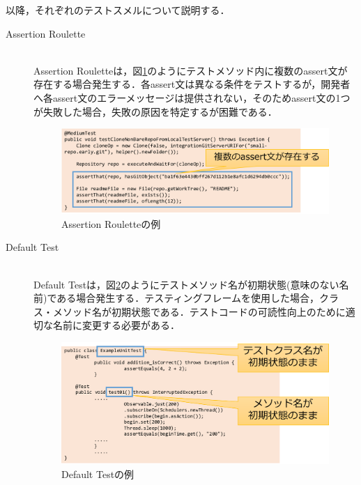 \documentclass[12pt]{jarticle} %
\begin{document}
以降，それぞれのテストスメルについて説明する．

\begin{description}
\item[Assertion Roulette]~\\
Assertion Rouletteは，図\ref{AR}のようにテストメソッド内に複数のassert文が存在する場合発生する．各assert文は異なる条件をテストするが，開発者へ各assert文のエラーメッセージは提供されない，そのためassert文の1つが失敗した場合，失敗の原因を特定するが困難である．

\begin{figure}[htbp]
  \begin{center}
    \includegraphics[clip,width=15cm]{AR.pdf}
    \caption{Assertion Rouletteの例}
    \label{AR}
  \end{center}
\end{figure}

\item[Default Test]~\\
Default Testは，図\ref{DT}のようにテストメソッド名が初期状態(意味のない名前)である場合発生する．テスティングフレームを使用した場合，クラス・メソッド名が初期状態である．テストコードの可読性向上のために適切な名前に変更する必要がある．

\begin{figure}[htbp]
  \begin{center}
    \includegraphics[clip,width=15cm]{DT.pdf}
    \caption{Default Testの例}
    \label{DT}
  \end{center}
\end{figure}


\end{description}
\end{document}
